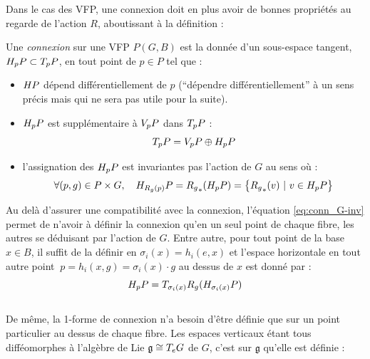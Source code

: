 Dans le cas des VFP, une connexion doit en plus avoir de bonnes propriétés au regarde de l'action $R$, aboutissant à la définition :
\begin{definition} \label{def:connexion2VFP}
	Une \emph{connexion} sur une VFP $P(G,B)$ est la donnée d'un sous-espace tangent, $\hg[p]{P}\subset \tg[p]{P}$, en tout point de $p\in P$ tel que :
	\begin{itemize}
		
		\item $\hg{P}$ dépend différentiellement de $p$ (``dépendre différentiellement'' à un sens précis mais qui ne sera pas utile pour la suite).
		
		\item $\hg[p]{P}$ est supplémentaire à $\vg[p]{P}$ dans $\tg[p]{P}$ :
		\begin{equation}\label{eq:TP=V+H}
			\tg[p]{P} = \vg[p]{P} \oplus \hg[p]{P}
		\end{equation}
		
		\item l'assignation des $\hg[p]{P}$ est invariantes pas l'action de $G$ au sens où :
		\begin{equation}\label{eq:conn_G-inv}
			\forall (p,g)\in P\times G,\quad \hg[R_g(p)]{P} = {R_g}_* (\hg[p]{P}) = \big\{{R_g}_*(v)\ |\ v \in \hg[p]{P} \big\}
		\end{equation}
	\end{itemize}
\end{definition}
\skipl

Au delà d'assurer une compatibilité avec la connexion, l'équation \eqref{eq:conn_G-inv} permet de n'avoir à définir la connexion qu'en un seul point de chaque fibre, les autres se déduisant par l'action de $G$. Entre autre, pour tout point de la base $x\in B$, il suffit de la définir en $\sigma_i(x) = h_i(e, x)$ et l'espace horizontale en tout autre point $\ p=h_i(x,g) = \sigma_i(x)\cdot g$ au dessus de $x$ est donné par :
\[\hg[p]{P} = \tg[\sigma_i(x)]{R_g} (\hg[\sigma_i(x)]{P})\]
\\
De même, la 1-forme de connexion n'a besoin d'être définie que sur un point particulier au dessus de chaque fibre. Les espaces verticaux étant tous difféomorphes à l'algèbre de Lie $\mathfrak{g}\cong \tg[e]{G}$ de $G$, c'est sur $\mathfrak{g}$ qu'elle est définie :

